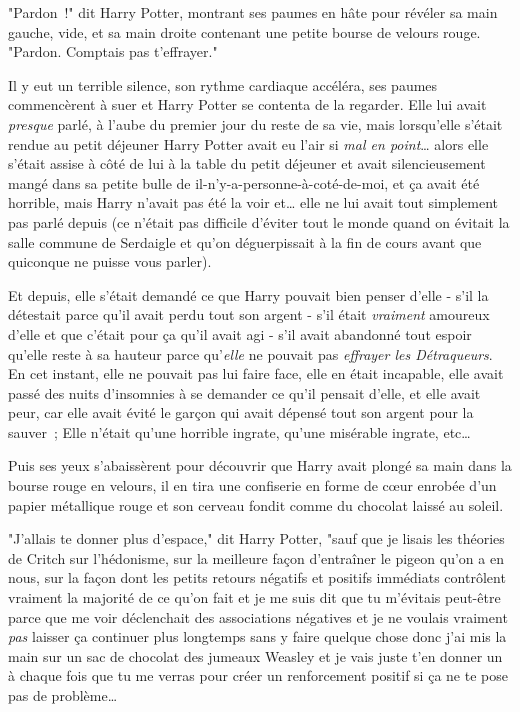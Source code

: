 "Pardon~!" dit Harry Potter, montrant ses paumes en hâte pour révéler sa main gauche, vide, et sa main droite contenant une petite bourse de velours rouge. "Pardon. Comptais pas t'effrayer."

Il y eut un terrible silence, son rythme cardiaque accéléra, ses paumes commencèrent à suer et Harry Potter se contenta de la regarder. Elle lui avait \emph{presque} parlé, à l'aube du premier jour du reste de sa vie, mais lorsqu'elle s'était rendue au petit déjeuner Harry Potter avait eu l'air si \emph{mal en point}… alors elle s'était assise à côté de lui à la table du petit déjeuner et avait silencieusement mangé dans sa petite bulle de il-n'y-a-personne-à-coté-de-moi, et ça avait été horrible, mais Harry n'avait pas été la voir et… elle ne lui avait tout simplement pas parlé depuis (ce n'était pas difficile d'éviter tout le monde quand on évitait la salle commune de Serdaigle et qu'on déguerpissait à la fin de cours avant que quiconque ne puisse vous parler).

Et depuis, elle s'était demandé ce que Harry pouvait bien penser d'elle - s'il la détestait parce qu'il avait perdu tout son argent - s'il était \emph{vraiment} amoureux d'elle et que c'était pour ça qu'il avait agi - s'il avait abandonné tout espoir qu'elle reste à sa hauteur parce qu'\emph{elle} ne pouvait pas \emph{effrayer les Détraqueurs}. En cet instant, elle ne pouvait pas lui faire face, elle en était incapable, elle avait passé des nuits d'insomnies à se demander ce qu'il pensait d'elle, et elle avait peur, car elle avait évité le garçon qui avait dépensé tout son argent pour la sauver~; Elle n'était qu'une horrible ingrate, qu'une misérable ingrate, etc…

Puis ses yeux s'abaissèrent pour découvrir que Harry avait plongé sa main dans la bourse rouge en velours, il en tira une confiserie en forme de cœur enrobée d'un papier métallique rouge et son cerveau fondit comme du chocolat laissé au soleil.

"J'allais te donner plus d'espace," dit Harry Potter, "sauf que je lisais les théories de Critch sur l'hédonisme, sur la meilleure façon d'entraîner le pigeon qu'on a en nous, sur la façon dont les petits retours négatifs et positifs immédiats contrôlent vraiment la majorité de ce qu'on fait et je me suis dit que tu m'évitais peut-être parce que me voir déclenchait des associations négatives et je ne voulais vraiment \emph{pas} laisser ça continuer plus longtemps sans y faire quelque chose donc j'ai mis la main sur un sac de chocolat des jumeaux Weasley et je vais juste t'en donner un à chaque fois que tu me verras pour créer un renforcement positif si ça ne te pose pas de problème…

